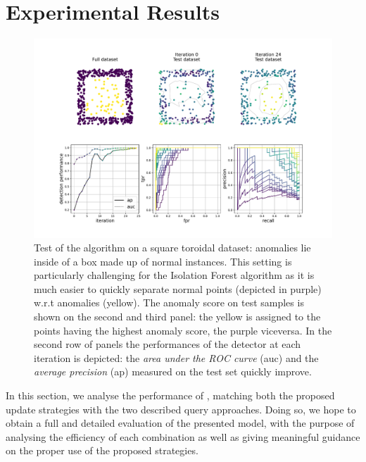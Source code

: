 \section{Experimental Results}
\label{exp}

\begin{figure}
    \centering
    \includegraphics[width=\textwidth]{square_toroid_6fig.pdf}
    \caption{Test of the algorithm on a square toroidal dataset: anomalies lie inside of a box made up of normal instances. This setting is particularly challenging for the Isolation Forest algorithm as it is much easier to quickly separate normal points (depicted in purple) w.r.t anomalies (yellow). The anomaly score on test samples is shown on the second and third panel: the yellow is assigned to the points having the highest anomaly score, the purple viceversa. In the second row of panels the performances of the detector at each iteration is depicted: the \emph{area under the ROC curve} (auc) and the \emph{average precision} (ap) measured on the test set quickly improve. }
    \label{fig:toroid}
\end{figure}


In this section,  we analyse the performance of \approach, matching both the proposed update strategies with the two described query approaches. Doing so, we hope to obtain a full and detailed evaluation of the presented model, with the purpose of analysing the efficiency of each combination as well as giving meaningful guidance on the proper use of the proposed strategies.

